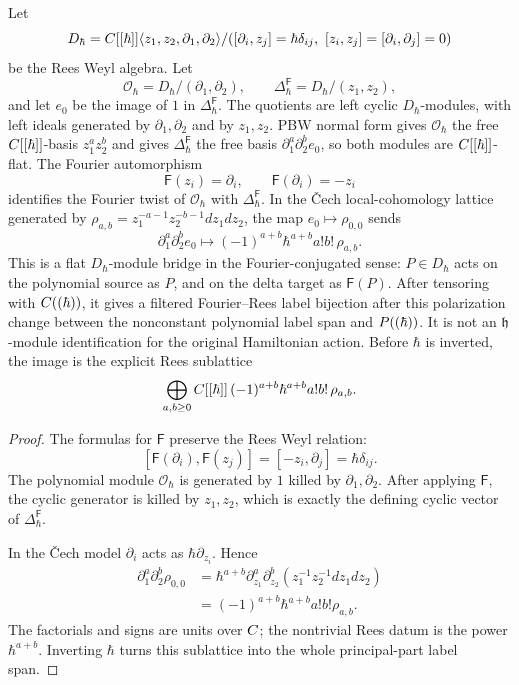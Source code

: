 \begin{thm}
  \label{thm:T5-fourier-rees-positive-construction}
  Let
  \[
    D_\hbar=
    \C[[\hbar]]\langle z_1,z_2,\partial_1,\partial_2\rangle/
    ([\partial_i,z_j]=\hbar\delta_{ij},\ [z_i,z_j]=[\partial_i,\partial_j]=0)
  \]
  be the Rees Weyl algebra.  Let
  \[
    \mathcal O_\hbar=D_\hbar/(\partial_1,\partial_2),\qquad
    \Delta^{\mathsf F}_\hbar=D_\hbar/(z_1,z_2),
  \]
  and let \(e_0\) be the image of \(1\) in
  \(\Delta^{\mathsf F}_\hbar\).  The quotients are left cyclic
  \(D_\hbar\)-modules, with left ideals generated by
  \(\partial_1,\partial_2\) and by \(z_1,z_2\). PBW normal form gives
  \(\mathcal O_\hbar\) the free \(C[[\hbar]]\)-basis \(z_1^az_2^b\)
  and gives \(\Delta^{\mathsf F}_\hbar\) the free basis
  \(\partial_1^a\partial_2^b e_0\), so both modules are
  \(C[[\hbar]]\)-flat.  The Fourier automorphism
  \[
    \mathsf F(z_i)=\partial_i,\qquad
    \mathsf F(\partial_i)=-z_i
  \]
  identifies the Fourier twist of \(\mathcal O_\hbar\) with
  \(\Delta^{\mathsf F}_\hbar\).  In the \v{C}ech local-cohomology lattice
  generated by
  \(\rho_{a,b}=z_1^{-a-1}z_2^{-b-1}dz_1dz_2\), the map
  \(e_0\mapsto\rho_{0,0}\) sends
  \[
    \partial_1^a\partial_2^b e_0
      \longmapsto
      (-1)^{a+b}\hbar^{a+b}a!b!\,\rho_{a,b}.
  \]
  This is a flat \(D_\hbar\)-module bridge in the Fourier-conjugated
  sense: \(P\in D_\hbar\) acts on the polynomial source as \(P\), and on
  the delta target as \(\mathsf F(P)\).  After tensoring with
  \(C((\hbar))\), it gives a filtered Fourier--Rees label bijection after
  this polarization change between the nonconstant polynomial label span and
  \(P((\hbar))\).  It is not an \(\mathfrak h\)-module identification
  for the original Hamiltonian action.  Before \(\hbar\) is inverted,
  the image is
  the explicit Rees sublattice
  \[
    \bigoplus_{a,b\ge0}
      C[[\hbar]]\,(-1)^{a+b}\hbar^{a+b}a!b!\,\rho_{a,b}.
  \]
\end{thm}

\begin{proof}
  The formulas for \(\mathsf F\) preserve the Rees Weyl relation:
  \[
    [\mathsf F(\partial_i),\mathsf F(z_j)]
      =[-z_i,\partial_j]=\hbar\delta_{ij}.
  \]
  The polynomial module \(\mathcal O_\hbar\) is generated by \(1\)
  killed by \(\partial_1,\partial_2\).  After applying \(\mathsf F\), the
  cyclic generator is killed by \(z_1,z_2\), which is exactly the
  defining cyclic vector of \(\Delta^{\mathsf F}_\hbar\).

  In the \v{C}ech model \(\partial_i\) acts as
  \(\hbar\partial_{z_i}\).  Hence
  \[
  \begin{aligned}
    \partial_1^a\partial_2^b\rho_{0,0}
      &=
      \hbar^{a+b}
      \partial_{z_1}^a\partial_{z_2}^b
      (z_1^{-1}z_2^{-1}dz_1dz_2)  \\
      &=(-1)^{a+b}\hbar^{a+b}a!b!\rho_{a,b}.
  \end{aligned}
  \]
  The factorials and signs are units over \(C\); the nontrivial Rees
  datum is the power \(\hbar^{a+b}\).  Inverting \(\hbar\) turns this
  sublattice into the whole principal-part label span.
\end{proof}

